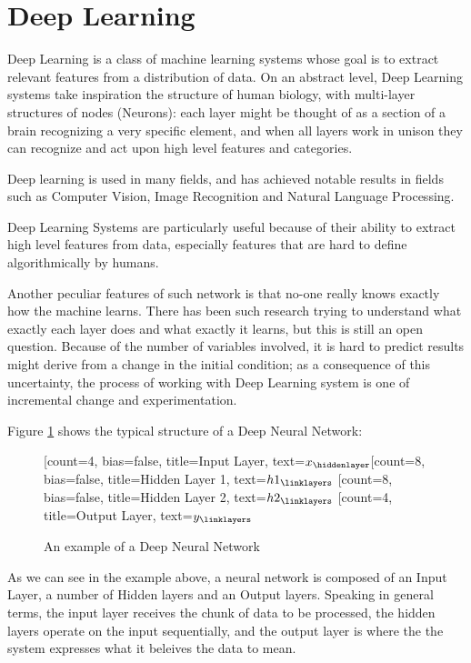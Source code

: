 \section{Deep Learning}
Deep Learning is a class of machine learning systems whose goal is to extract relevant features from a distribution of data. On an abstract level, Deep Learning systems take inspiration the structure of human biology, with multi-layer structures of nodes (Neurons): each layer might be thought of as a section of a brain recognizing a very specific element, and when all layers work in unison they can recognize and act upon high level features and categories.

Deep learning is used in many fields, and has achieved notable results in fields such as Computer Vision, Image Recognition and Natural Language Processing.%

Deep Learning Systems are particularly useful because of their ability to extract high level features from data, especially features that are hard to define algorithmically by humans.

Another peculiar features of such network is that no-one really knows exactly how the machine learns. There has been such research trying to understand what exactly each layer does and what exactly it learns, but this is still an open question.\newline %
Because of the number of variables involved, it is hard to predict results might derive from a change in the initial condition; as a consequence of this uncertainty, the process of working with Deep Learning system is one of incremental change and experimentation. 

Figure \ref{fig:DNN} shows the typical structure of a Deep Neural Network:
\begin{figure}[H]
\centering    
\begin{neuralnetwork}[height=8]
\newcommand{\x}[2]{$x_#2$}
\newcommand{\y}[2]{$y_#2$}
\newcommand{\hfirst}[2]{\small $h1_#2$}
\newcommand{\hsecond}[2]{\small $h2_#2$}
[count=4, bias=false, title=Input Layer, text=\x]
\hiddenlayer[count=8, bias=false, title=Hidden Layer 1, text=\hfirst] \linklayers
\hiddenlayer[count=8, bias=false, title=Hidden Layer 2, text=\hsecond] \linklayers
\outputlayer[count=4, title=Output Layer, text=\y] \linklayers
\end{neuralnetwork}
\caption{An example of a Deep Neural Network}\label{fig:DNN}
\end{figure}
As we can see in the example above, a neural network is composed of an Input Layer, a number of Hidden layers and an Output layers.
Speaking in general terms, the input layer receives the chunk of data to be processed, the hidden layers operate on the input sequentially, and the output layer is where the the system expresses what it beleives the data to mean.

